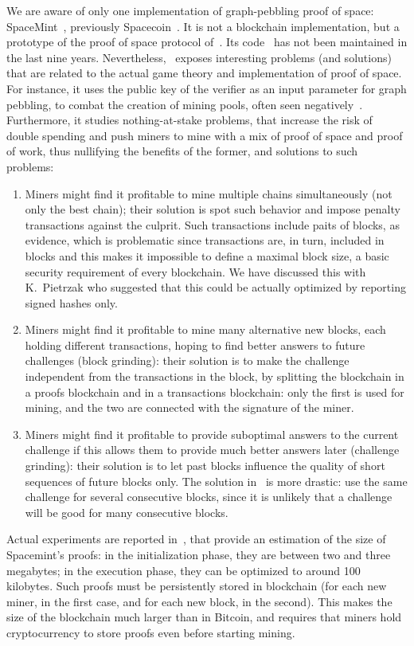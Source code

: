 We are aware of only one implementation of graph-pebbling proof of space:
SpaceMint~\cite{ParkKFGAP18}, previously Spacecoin~\cite{ParkPAFG15}.
It is not a blockchain implementation,
but a prototype of the proof of space protocol of~\cite{DziembowskiFKP15}.
Its code~\cite{SpaceMintCode} has not been maintained in the last nine years.
Nevertheless, \cite{ParkKFGAP18}~exposes interesting problems (and solutions)
that are related to the actual game theory and implementation of proof of space.
For instance, it uses the public key of the verifier as an input parameter
for graph pebbling, to combat the creation of mining pools, often seen
negatively~\cite{MillerKKS15}.
Furthermore, it studies nothing-at-stake problems, that increase the risk of double spending
and push miners to mine with a mix of proof of space and proof of work,
thus nullifying the benefits of the former, and solutions to such problems:
%
\begin{enumerate}
\item Miners might find it profitable to mine multiple chains simultaneously (not only the best chain);
  their solution is spot such behavior and impose penalty transactions against the culprit.
  Such transactions include paits of blocks, as evidence, which is
  problematic since transactions are, in turn, included in blocks and this makes it impossible to define
  a maximal block size, a basic security requirement of every blockchain.
  We have discussed this with K.\ Pietrzak who suggested that this could be actually optimized
  by reporting signed hashes only.
\item Miners might find it profitable to mine many alternative new blocks, each holding
  different transactions, hoping to find better answers to future challenges (block grinding): their
  solution is to make the challenge independent from the transactions in the block,
  by splitting the
  blockchain in a proofs blockchain and in a transactions blockchain: only the first is used for mining,
  and the two are connected with the signature of the miner.
\item Miners might find it profitable to provide suboptimal answers to the current challenge if
  this allows them to provide much better answers later (challenge grinding): their solution is
  to let past blocks influence the quality of short sequences of future blocks only.
  The solution in~\cite{CohenP19} is more drastic: use the same challenge for several consecutive blocks,
  since it is unlikely that a challenge will be good for many consecutive blocks.
\end{enumerate}
%
Actual experiments are reported in~\cite{ParkKFGAP18},
that provide an estimation of the size of Spacemint's proofs:
in the initialization phase, they are between two and three megabytes;
in the execution phase, they can be optimized to around 100 kilobytes.
Such proofs must be persistently stored in
blockchain (for each new miner, in the first case, and for each new block, in the second).
This makes the size of the blockchain much larger than in Bitcoin, and requires
that miners hold cryptocurrency to store proofs even before starting mining.

